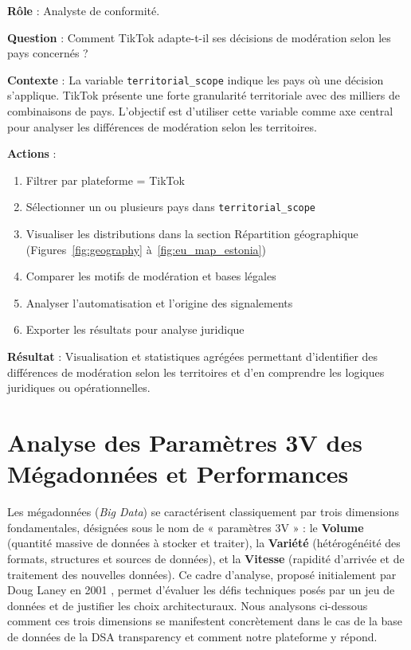 \documentclass[10pt,twocolumn,a4paper]{article}
\begin{document}
\textbf{Rôle} : Analyste de conformité.

\textbf{Question} : Comment TikTok adapte-t-il ses décisions de modération selon les pays concernés ?

\textbf{Contexte} : La variable \texttt{territorial\_scope} indique les pays où une décision s'applique. TikTok présente une forte granularité territoriale avec des milliers de combinaisons de pays. L'objectif est d'utiliser cette variable comme axe central pour analyser les différences de modération selon les territoires.

\textbf{Actions} :
\begin{enumerate}
    \item Filtrer par plateforme = TikTok
    \item Sélectionner un ou plusieurs pays dans \texttt{territorial\_scope}
    \item Visualiser les distributions dans la section Répartition géographique (Figures~\ref{fig:geography} à~\ref{fig:eu_map_estonia})
    \item Comparer les motifs de modération et bases légales
    \item Analyser l'automatisation et l'origine des signalements
    \item Exporter les résultats pour analyse juridique
\end{enumerate}

\textbf{Résultat} : Visualisation et statistiques agrégées permettant d'identifier des différences de modération selon les territoires et d'en comprendre les logiques juridiques ou opérationnelles.


\section{Analyse des Paramètres 3V des Mégadonnées et Performances}

Les mégadonnées (\textit{Big Data}) se caractérisent classiquement par trois dimensions fondamentales, désignées sous le nom de « paramètres 3V » \cite{laney2001}: le \textbf{Volume} (quantité massive de données à stocker et traiter), la \textbf{Variété} (hétérogénéité des formats, structures et sources de données), et la \textbf{Vitesse} (rapidité d'arrivée et de traitement des nouvelles données). Ce cadre d'analyse, proposé initialement par Doug Laney en 2001 \cite{laney2001}, permet d'évaluer les défis techniques posés par un jeu de données et de justifier les choix architecturaux. Nous analysons ci-dessous comment ces trois dimensions se manifestent concrètement dans le cas de la base de données de la DSA transparency et comment notre plateforme y répond.
\end{document}
